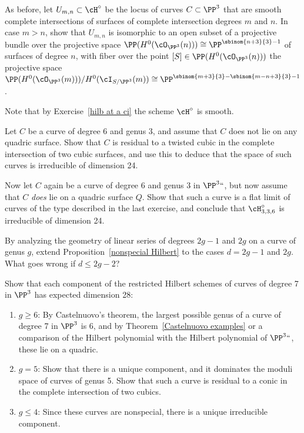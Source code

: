 \begin{exercise}\label{second complete intersection exercise}
As before, let $U_{m,n} \subset \cH^\circ$ be the locus of curves $C
\subset \PP^3$ that are smooth complete intersections of surfaces of
complete intersection
degrees $m$ and $n$.
 In case $m > n$, show that $U_{m,n}$ is isomorphic to an open subset of
 a projective bundle over the projective space $\PP(H^0(\cO_{\PP^3}(n)))
 \cong \PP^{\sbinom{n+3}{3}-1}$ of surfaces of degree $n$, with fiber
 over the point $[S] \in \PP(H^0(\cO_{\PP^3}(n)))$ the projective space
 $\PP(H^0(\cO_{\PP^3}(m)))/H^0(\cI_{S/\PP^3}(m)) \cong \PP^{\sbinom{m+3}{3}
 - \sbinom{m-n+3}{3} - 1}$.

 Note that  by Exercise~\ref{hilb at a ci}  the scheme $\cH^\circ$
 is smooth.
\end{exercise}

\begin{exercise}\label{6,3:1}
Let $C$ be a curve of degree 6 and genus 3, and assume that $C$ does
not lie on any quadric surface. Show that $C$ is residual to a twisted
cubic in the complete intersection of two cubic surfaces, and use this
to deduce that the space of such curves is irreducible of dimension 24.
\end{exercise}


\begin{exercise}\label{6,3:2}
Now let $C$ again be a curve of degree 6 and genus 3 in $\PP^3` `$, but
now assume that $C$ \emph{does} lie on a quadric surface $Q$. Show that
such a curve is a flat limit of curves of the type described in the
last exercise, and conclude that $\cH^\circ_{3,3,6}$ is irreducible of
%
dimension 24.
\end{exercise}

\begin{exercise}
By analyzing the geometry of linear series of degrees $2g-1$ and $2g$
on a curve of genus $g$, extend Proposition~\ref{nonspecial Hilbert}
to the cases $d = 2g-1$ and $2g$. What goes wrong if $d \leq 2g-2$?
\end{exercise}

\begin{exercise}\label{degree 7 analysis}
Show that each component of the restricted Hilbert schemes of curves of
degree 7
in $\PP^3$ has expected dimension 28:
\begin{enumerate}
 \item $g\geq 6$:
By Castelnuovo's theorem, the largest possible genus of a curve of degree
%
7 in $\PP^3$ is 6, and
by Theorem~\ref{Castelnuovo examples} or a comparison of the Hilbert
polynomial
with the Hilbert polynomial of $\PP^3` `$, these lie on a quadric.
 \item $g=5$: Show that there is a unique component, and it dominates
 the moduli space of curves of genus 5.
 Show that such a  curve is residual to a conic in the complete
 intersection of two cubics.
 \item $g\leq 4$: Since these curves are nonspecial,  there is a unique
 irreducible component.
\end{enumerate}
\end{exercise}



